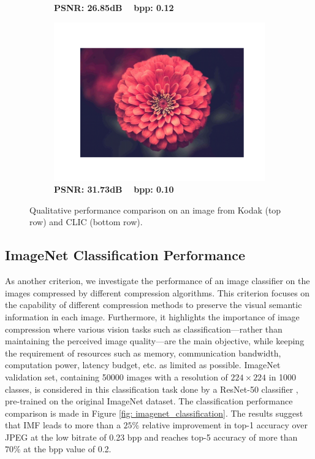 \begin{figure}[t]
\begin{subfigure}{.23\textwidth}
		\vspace{-20pt}
		\caption*{\tiny \textbf{PSNR: 26.85dB ~ bpp: 0.12}}
	\end{subfigure}
	\begin{subfigure}{.23\textwidth}
		\centering
		\includegraphics[trim=1.7cm 1.5cm 1.7cm 1.7cm, clip, width=1\textwidth]{figures/clic_flower_IMF - YCbCr_bpp_0.108.pdf}
		\vspace{-20pt}
		\caption*{\tiny \textbf{PSNR: 31.73dB ~ bpp: 0.10}}
	\end{subfigure}
	
	\caption{Qualitative performance comparison on an image from Kodak (top row) and CLIC (bottom row).}
	\label{fig:qualitative_comparison}
\end{figure}


\subsection{ImageNet Classification Performance} \label{sec: imagenet Classification Performance}

As another criterion, we investigate the performance of an image classifier on the images compressed by different compression algorithms. 
This criterion focuses on the capability of different compression methods to preserve the visual semantic information in each image.
Furthermore, it highlights the importance of image compression where various vision tasks such as classification---rather than maintaining the perceived image quality---are the main objective, while keeping the requirement of resources such as memory, communication bandwidth, computation power, latency budget, etc. as limited as possible.
ImageNet \cite{deng2009imagenet} validation set, containing 50000 images with a resolution of $224 \times 224$ in 1000 classes, is considered in this classification task done by a ResNet-50 classifier \cite{he2016deep}, pre-trained on the original ImageNet dataset.
The classification performance comparison is made in Figure \ref{fig: imagenet_classification}. 
The results suggest that IMF leads to more than a $25\%$ relative improvement in top-1 accuracy over JPEG at the low bitrate of 0.23 bpp and reaches top-5 accuracy of more than $70\%$ at the bpp value of 0.2. 


